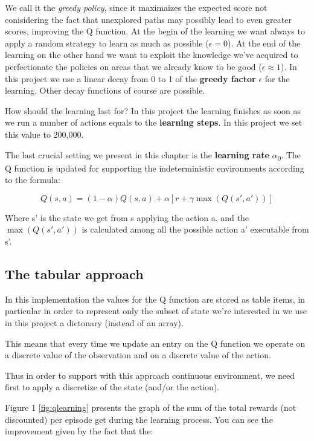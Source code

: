 \documentclass{article}
\begin{document}
We call it the \emph{greedy policy}, since it maximaizes the expected score not conisidering the fact that unexplored paths may
possibly lead to even greater scores, improving the Q function.
At the begin of the learning we want always to apply a random strategy to learn as much as possible ($\epsilon = 0$).
At the end of the learning on the other hand we want to exploit the knowledge we've acquired to perfectionate the policies on areas
that we already know to be good ($\epsilon \approx 1$).
In this project we use a linear decay from 0 to 1 of the \textbf{greedy factor} $\epsilon$ for the learning.
Other decay functions of course are possible.

How should the learning last for? In this project the learning finishes as soon as we run a number of actions
equals to the \textbf{learning steps}. In this project we set this value to 200,000.

The last crucial setting we present in this chapter is the \textbf{learning rate} $\alpha$\textsubscript{0}.
The Q function is updated for supporting the indeterministic environments according to the formula:

\begin{equation}
  Q(s,a) = (1 - \alpha) Q(s,a) + \alpha [r + \gamma \max (Q(s',a'))]
\end{equation}

Where s' is the state we get from s applying the action a, 
and the $\max (Q(s',a'))$ is calculated among all the possible action a' executable from s'.

\subsection{The tabular approach}

In this implementation the values for the Q function are stored as table items,
in particular in order to represent only the subset of state we're interested in we use 
in this project a dictonary (instead of an array).

This means that every time we update an entry on the Q function we operate on a discrete value of the
observation and on a discrete value of the action.

Thus in order to support with this approach continuous environment,
we need first to apply a discretize of the state (and/or the action).

Figure 1 \ref{fig:qlearning} presents the graph of the sum of the total rewards (not discounted) per episode get during the learning process.
You can see the improvement given by the fact that the:
\end{document}
